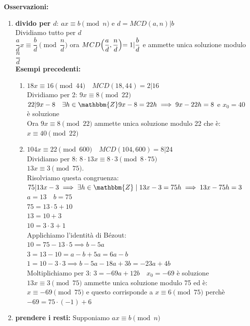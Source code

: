\documentclass[12pt, letterpaper]{report}
\begin{document}
		\textbf{Osservazioni:}
		\begin{enumerate}
			\item \textbf{divido per $d$}: $ax \equiv b \pmod{n}$ e $d=MCD(a,n)|b$ \\
			Dividiamo tutto per $d$ \\
			$\dfrac{a}{d}x \equiv \dfrac{b}{d} \pmod{\dfrac{n}{d}}$ ora $MCD\Bigl(\dfrac{a}{d}, \dfrac{n}{d}\Bigl) = 1 | \dfrac{b}{d}$ e ammette unica soluzione modulo $\dfrac{n}{d}$ \\
			\textbf{Esempi precedenti:}
			\begin{enumerate}
				\item $18x \equiv 16 \pmod{44} \quad MCD(18,44)=2|16$ \\
				Dividiamo per 2:
				$9x \equiv 8 \pmod{22}$ \\
				$22|9x - 8 \quad \exists h \in \mathbbm{Z} 9x - 8 = 22h \implies 9x-22h=8$ e $x_0 = 40$ è soluzione \\
				Ora $9x \equiv 8 \pmod{22}$ ammette unica soluzione modulo 22 che è: $x \equiv 40 \pmod{22}$
				\item $104x \equiv 22 \pmod{600} \quad MCD(104,600) = 8|24$ \\
				Dividiamo per 8:  $8 \cdot 13x \equiv 8 \cdot 3 \pmod{8 \cdot 75}$ \\
				$13x \equiv 3 \pmod{75}$. \\
				Risolviamo questa congruenza: $75|13x-3 \implies \exists h \in \mathbbm{Z} \mid 13x - 3 = 75h \implies 13x - 75h = 3$ \\
				$a=13 \quad b=75$ \\
				$75 = 13 \cdot 5 + 10$ \\
				$13 = 10 + 3$ \\
				$10 = 3 \cdot 3 + 1$ \\
				Applichiamo l'identità di Bézout: \\
				$10 = 75 - 13 \cdot 5 \implies b - 5a$ \\
				$3 = 13 - 10 = a - b + 5a = 6a - b$ \\
				$1 = 10 - 3 \cdot 3 \implies b - 5a - 18a + 3b = -23a + 4b$ \\
				Moltiplichiamo per 3: $3 = -69a + 12b \quad x_0 = -69$ è soluzione \\
				$13x \equiv 3 \pmod{75}$ ammette unica soluzione modulo 75 ed è: $x \equiv -69 \pmod{75}$ e questo corrisponde a $x \equiv 6 \pmod{75}$ perchè $-69=75 \cdot (-1) + 6$
			\end{enumerate}
			\item \textbf{prendere i resti:} Supponiamo $ax \equiv b \pmod{n}$ \\

\end{enumerate}
\end{document}
